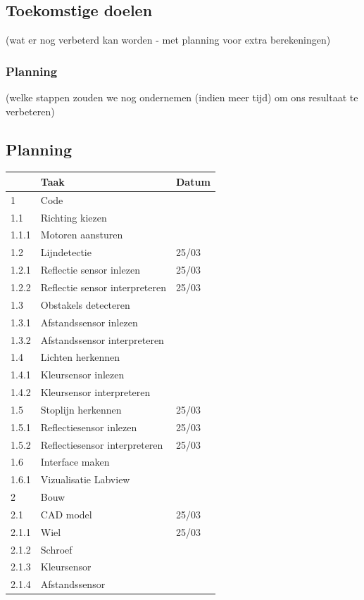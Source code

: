 \documentclass[kulak]{kulakarticle} %
\begin{document}
\subsection{Toekomstige doelen}
(wat er nog verbeterd kan worden - met planning voor extra berekeningen)
\subsubsection{Planning} %
(welke stappen zouden we nog ondernemen (indien meer tijd) om ons resultaat te verbeteren)


\subsection{Planning}
\begin{tabular}{lll}
	& Taak & Datum \\ \hline
	1 & Code & \\
	1.1 & Richting kiezen & \\
	1.1.1 & Motoren aansturen & \\
	1.2 & Lijndetectie & 25/03 \\
	1.2.1 & Reflectie sensor inlezen & 25/03\\
	1.2.2 & Reflectie sensor interpreteren & 25/03 \\
	1.3 & Obstakels detecteren & \\
	1.3.1 & Afstandssensor inlezen & \\
	1.3.2 & Afstandssensor interpreteren & \\
	1.4 & Lichten herkennen & \\
	1.4.1 & Kleursensor inlezen & \\
	1.4.2 & Kleursensor interpreteren & \\
	1.5 & Stoplijn herkennen & 25/03\\
	1.5.1 & Reflectiesensor inlezen & 25/03\\
	1.5.2 & Reflectiesensor interpreteren & 25/03\\
	1.6 & Interface maken & \\
	1.6.1 & Vizualisatie Labview & \\
	\hline
	2 & Bouw & \\
	2.1 & CAD model & 25/03\\
	2.1.1 & Wiel & 25/03\\
	2.1.2 & Schroef & \\
	2.1.3 & Kleursensor & \\
	2.1.4 & Afstandssensor & \\

\end{tabular}
\end{document}
